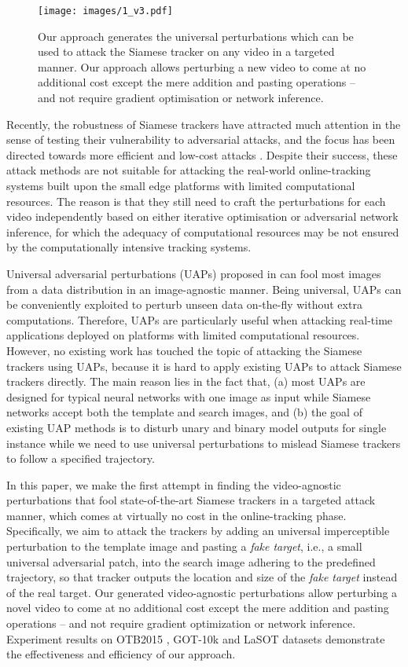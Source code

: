 \documentclass{article}
\newcommand{\ie}{i.e.}
\begin{document}
\begin{figure}[htbp]
\centering
\texttt{[image: images/1\_v3.pdf]}
\caption{Our approach generates the universal perturbations which can be used to attack the Siamese tracker on any video in a targeted manner. Our approach allows perturbing a new video to come at no additional cost except the mere addition and pasting operations -- and not require gradient optimisation or network inference.}
\end{figure}

Recently, the robustness of Siamese trackers have attracted much attention in the sense of testing their vulnerability to adversarial attacks, and the focus has been directed towards more efficient and low-cost attacks \cite{TTP,FAN,SPARK}. Despite their success, these attack methods are not suitable for attacking the real-world online-tracking systems built upon the small edge platforms with limited computational resources. The reason is that they still need to craft the perturbations for each video independently based on either iterative optimisation or adversarial network inference, for which the adequacy of computational resources may be not ensured by the computationally intensive tracking systems. 

Universal adversarial perturbations (UAPs) proposed in \cite{UAP} can fool most images from a data distribution in an image-agnostic manner. Being universal, UAPs can be conveniently exploited to perturb unseen data on-the-fly without extra computations. Therefore, UAPs are particularly useful when attacking real-time applications deployed on platforms with limited computational resources. However, no existing work has touched the topic of attacking the Siamese trackers using UAPs, because it is hard to apply existing UAPs to attack Siamese trackers directly. The main reason lies in the fact that, (a) most UAPs are designed for typical neural networks with one image as input while Siamese networks accept both the template and search images, and (b) the goal of existing UAP methods is to disturb unary and binary model outputs for single instance while we need to use universal perturbations to mislead Siamese trackers to follow a specified trajectory.

In this paper, we make the first attempt in finding the video-agnostic perturbations that fool state-of-the-art Siamese trackers in a targeted attack manner, which comes at virtually no cost in the online-tracking phase. Specifically, we aim to attack the trackers by adding an universal imperceptible perturbation to the template image and pasting a \textit{fake target}, \ie, a small universal adversarial patch, into the search image adhering to the predefined trajectory, so that tracker outputs the location and size of the \textit{fake target} instead of the real target. Our generated video-agnostic perturbations allow perturbing a novel video to come at no additional cost except the mere addition and pasting operations -- and not require gradient optimization or network inference. Experiment results on OTB2015 \cite{OTB}, GOT-10k \cite{GOT-10k} and LaSOT \cite{GOT-10k} datasets demonstrate the effectiveness and efficiency of our approach.
\end{document}
